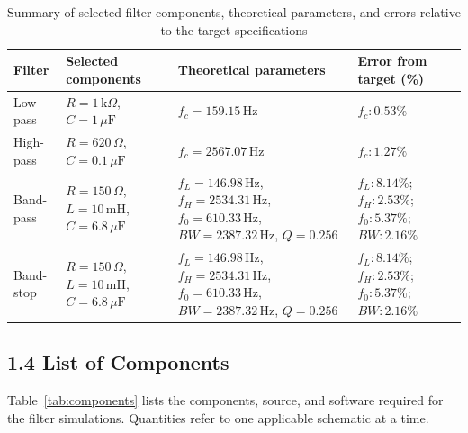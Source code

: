\documentclass[12pt,a4paper]{article}
\begin{document}
\begin{table}[H]
  \centering
  \caption{Summary of selected filter components, theoretical parameters, and errors relative to the target specifications}
  \label{tab:design-summary}
  \setlength{\tabcolsep}{3pt}
  \renewcommand{\arraystretch}{1.2}
  \begin{tabularx}{\textwidth}{|>{\raggedright\arraybackslash}p{}|>{\raggedright\arraybackslash}p{}|>{\raggedright\arraybackslash}p{}|X|}
    \hline
    \textbf{Filter} & \textbf{Selected components} & \textbf{Theoretical parameters} & \textbf{Error from target (\%)} \\
    \hline
    Low-pass & $R=1\,\mathrm{k}\Omega$, $C=1\,\mu\mathrm{F}$ & $f_c=159.15\,\mathrm{Hz}$ & $f_c: 0.53\%$ \\
    \hline
    High-pass & $R=620\,\Omega$, $C=0.1\,\mu\mathrm{F}$ & $f_c=2567.07\,\mathrm{Hz}$ & $f_c: 1.27\%$ \\
    \hline
    Band-pass & $R=150\,\Omega$, $L=10\,\mathrm{mH}$, $C=6.8\,\mu\mathrm{F}$ & $f_L=146.98\,\mathrm{Hz}$, $f_H=2534.31\,\mathrm{Hz}$, $f_0=610.33\,\mathrm{Hz}$, $BW=2387.32\,\mathrm{Hz}$, $Q=0.256$ & $f_L: 8.14\%$; $f_H: 2.53\%$; $f_0: 5.37\%$; $BW: 2.16\%$ \\
    \hline
    Band-stop & $R=150\,\Omega$, $L=10\,\mathrm{mH}$, $C=6.8\,\mu\mathrm{F}$ & $f_L=146.98\,\mathrm{Hz}$, $f_H=2534.31\,\mathrm{Hz}$, $f_0=610.33\,\mathrm{Hz}$, $BW=2387.32\,\mathrm{Hz}$, $Q=0.256$ & $f_L: 8.14\%$; $f_H: 2.53\%$; $f_0: 5.37\%$; $BW: 2.16\%$ \\
    \hline
\end{tabularx}
\end{table}

\clearpage
\subsection*{1.4 List of Components}

Table~\ref{tab:components} lists the components, source, and software required for the filter simulations. Quantities refer to one applicable schematic at a time.
\end{document}
